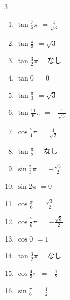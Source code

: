\begin{multicols}{3}
\begin{enumerate}
  \item $\displaystyle \tan{\frac{7}{6}\pi}$
        $\displaystyle =\frac{1}{\sqrt{3}}$

  \item $\displaystyle \tan{\frac{\pi}{3}}$
        $\displaystyle =\sqrt{3}$

  \item $\displaystyle \tan{\frac{3}{2}\pi}$
        $\displaystyle \quad なし$

\columnbreak %

  \item $\displaystyle \tan{0}$
        $\displaystyle =0$

  \item $\displaystyle \tan{\frac{\pi}{3}}$
        $\displaystyle =\sqrt{3}$

  \item $\displaystyle \tan{\frac{11}{6}\pi}$
        $\displaystyle =-\frac{1}{\sqrt{3}}$

  \item $\displaystyle \cos{\frac{7}{4}\pi}$
        $\displaystyle =\frac{1}{\sqrt{2}}$

  \item $\displaystyle \tan{\frac{\pi}{2}}$
        $\displaystyle \quad なし$

  \item $\displaystyle \sin{\frac{5}{3}\pi}$
        $\displaystyle =-\frac{\sqrt{3}}{2}$

  \item $\displaystyle \sin{2\pi}$
        $\displaystyle =0$

  \item $\displaystyle \cos{\frac{\pi}{6}}$
        $\displaystyle =\frac{\sqrt{3}}{2}$

  \item $\displaystyle \cos{\frac{7}{6}\pi}$
        $\displaystyle =-\frac{\sqrt{3}}{2}$

  \item $\displaystyle \cos{0}$
        $\displaystyle =1$

  \item $\displaystyle \tan{\frac{3}{2}\pi}$
        $\displaystyle \quad なし$

  \item $\displaystyle \cos{\frac{4}{3}\pi}$
        $\displaystyle =-\frac{1}{2}$

  \item $\displaystyle \sin{\frac{\pi}{6}}$
        $\displaystyle =\frac{1}{2}$


\end{enumerate}
\end{multicols}
